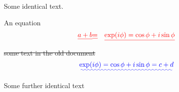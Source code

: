 \documentclass{article}
\providecommand{\DIFadd}[1]{{\protect\color{blue}\uwave{#1}}} %
\providecommand{\DIFdel}[1]{{\protect\color{red}\sout{#1}}}                      %
\providecommand{\DIFaddbegin}{} %
\providecommand{\DIFaddend}{} %
\providecommand{\DIFdelbegin}{} %
\providecommand{\DIFdelend}{} %
\begin{document}
Some identical text.

An equation
\DIFdelbegin \begin{eqnarray*}
\DIFdel{a + b }& \DIFdel{= }& \DIFdel{\exp(i\phi)=\cos \phi + i \sin \phi
}\end{eqnarray*}
\DIFdel{some text in the old document
}\DIFdelend \DIFaddbegin \begin{displaymath}
\DIFadd{\exp(i\phi)=\cos \phi + i \sin \phi = c + d
}\end{displaymath}
\DIFaddend 

Some further identical text
\end{document}
